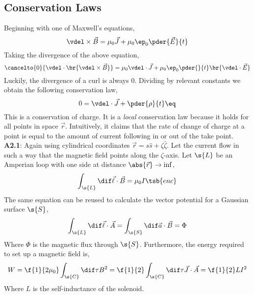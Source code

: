 \documentclass{article}
\begin{document}
\subsection{Conservation Laws}
Beginning with one of Maxwell's equations,
\[ \vdel \times \vec{B} = \mu_0 \vec{J} + \mu_0 \ep_0 \pder{\vec{E}}{t} \]
Taking the divergence of the above equation,
\[ \cancelto{0}{\vdel \cdot \br{\vdel \times \vec{B}}} = \mu_0 \vdel \cdot \vec{J} + \mu_0 \ep_0 \pder{}{t}\br{\vdel \cdot \vec{E}} \]
Luckily, the divergence of a curl is always $0$. Dividing by relevant constants we obtain the following conservation law,
\[ 0 = \vdel \cdot \vec{J} + \pder{\rho}{t} \eq \label{eq:conservation_charge}\]
This is a conservation of charge. It is a \textit{local} conservation law because it holds for all points in space $\vec{r}$. Intuitively, it claims that the rate of change of charge at a point is equal to the amount of current following in or out of the take point. \\

\textbf{A2.1}: Again using cylindrical coordinates $\vec{r} = s \hat{s} + \zeta \hat{\zeta}$. Let the current flow in such a way that the magnetic field points along the $\zeta$-axis. Let $\s{L}$ be an Amperian loop with one side at distance $\abs{\vec{r}} \to \inf$,
\[ \int_{\s{L}} \dif \vec{\ell} \cdot \vec{B} = \mu_0 I\tsb{enc} \]
The same equation can be reused to calculate the vector potential for a Gaussian surface $\s{S}$,
\[ \int_{\s{L}} \dif \vec{\ell} \cdot \vec{A} = \int_{\s{S}} \dif \vec{a} \cdot \vec{B} = \Phi \]
Where $\Phi$ is the magnetic flux through $\s{S}$. Furthermore, the energy required to set up a magnetic field is,
\[ W = \f{1}{2 \mu_0} \int_{\s{C}} \dif \tau B^2 = \f{1}{2} \int_{\s{C}} \dif \tau \vec{J} \cdot \vec{A} = \f{1}{2} L I^2 \]
Where $L$ is the self-inductance of the solenoid.
\end{document}
